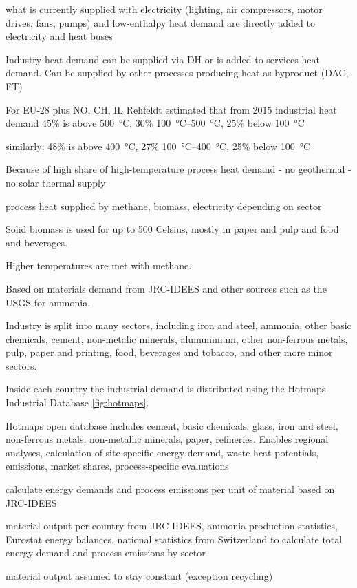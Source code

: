 what is currently supplied with electricity (lighting, air compressors, motor drives, fans, pumps)
and low-enthalpy heat demand are directly added to electricity and heat buses

Industry heat demand can be supplied via DH or is added to services heat demand.
Can be supplied by other processes producing heat as byproduct (DAC, FT)

For EU-28 plus NO, CH, IL Rehfeldt estimated that from 2015 industrial heat demand
45\% is above \SI{500}{\celsius}, 30\% \SIrange{100}{500}{\celsius}, 25\% below \SI{100}{\celsius}

 similarly:
48\% is above \SI{400}{\celsius}, 27\% \SIrange{100}{400}{\celsius}, 25\% below \SI{100}{\celsius}

Because of high share of high-temperature process heat demand
- no geothermal
- no solar thermal supply

process heat supplied by methane, biomass, electricity depending on sector

Solid biomass is used for up to 500 Celsius, mostly in paper and pulp and food
and beverages.

Higher temperatures are met with methane.

Based on materials demand from JRC-IDEES and other sources such as the USGS for
ammonia.

Industry is split into many sectors, including iron and steel, ammonia, other
basic chemicals, cement, non-metalic minerals, alumuninium, other non-ferrous
metals, pulp, paper and printing, food, beverages and tobacco, and other more
minor sectors.

Inside each country the industrial demand is distributed using the Hotmaps
Industrial Database \cref{fig:hotmaps}.

Hotmaps open database includes cement, basic chemicals, glass, iron and steel, non-ferrous metals,
non-metallic minerals, paper, refineries. Enables regional analyses, calculation of
site-specific energy demand, waste heat potentials, emissions, market shares,
process-specific evaluations

calculate energy demands and process emissions per unit of material based on JRC-IDEES

material output per country from JRC IDEES, ammonia production statistics,
Eurostat energy balances, national statistics from Switzerland to calculate total energy demand
and process emissions by sector

material output assumed to stay constant (exception recycling)

